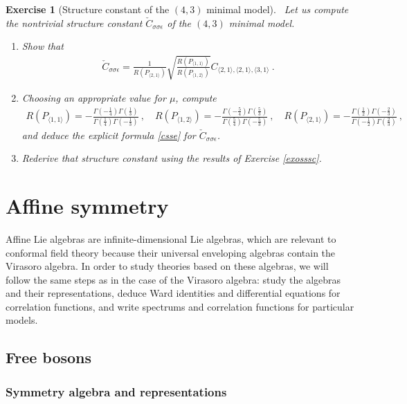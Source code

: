 \documentclass[12pt, a4paper, notitlepage, twoside]{report}
\numberwithin{equation}{section}
\theoremstyle{break}
\newtheorem{exo}{Exercise}[chapter]
\begin{document}
\begin{exo}[Structure constant of the $(4,3)$ minimal model]
 ~\label{exocsse}
 Let us compute the nontrivial structure constant $\check{C}_{\sigma\sigma\epsilon} $ of the $(4,3)$ minimal model.
 \begin{enumerate}
  \item Show that 
\begin{align}
 \check{C}_{\sigma\sigma\epsilon} = \frac{1}{R(P_{\langle 2,1 \rangle})}\sqrt{\frac{R(P_{\langle 1,1 \rangle})}{R(P_{\langle 1,2 \rangle})}} C_{\langle 2,1\rangle , \langle 2,1 \rangle,\langle 3,1 \rangle}\ .
\end{align}
\item Choosing an appropriate value for $\mu$, compute
\begin{align}
 R(P_{\langle 1,1 \rangle}) = -\frac{\Gamma(-\frac14)\Gamma(\frac13)}{\Gamma(\frac14)\Gamma(-\frac13)} \ , \quad R(P_{\langle 1,2 \rangle}) = -\frac{\Gamma(-\frac54)\Gamma(\frac53)}{\Gamma(\frac54)\Gamma(-\frac53)} \ , \quad R(P_{\langle 2,1 \rangle}) = -\frac{\Gamma(\frac12)\Gamma(-\frac23)}{\Gamma(-\frac12)\Gamma(\frac23)}\ ,
\end{align}
and deduce the explicit formula \eqref{csse} for $\check{C}_{\sigma\sigma\epsilon}$.
\item Rederive that structure constant using the results of Exercise \ref{exosssc}.
 \end{enumerate}
\end{exo}


\chapter{Affine symmetry \label{secaff}}

Affine Lie algebras are infinite-dimensional Lie algebras, which are relevant to conformal field theory because their universal enveloping algebras contain the Virasoro algebra.
In order to study theories based on these algebras, we will follow the same steps as in the case of the Virasoro algebra: study the algebras and their representations, deduce Ward identities and differential equations for correlation functions, and write spectrums and correlation functions for particular models. 

\section{Free bosons}

\subsection{Symmetry algebra and representations \label{secaua}}
\end{document}
